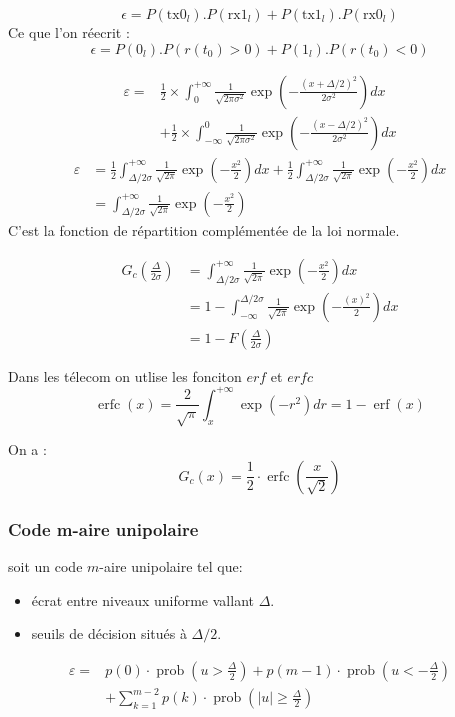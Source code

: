 \documentclass[main.tex]{subfiles}
\begin{document}
\[
\epsilon  = P(\text{tx} 0_l).P(\text{rx} 1_l) + P(\text{tx} 1_l).P(\text{rx} 0_l) 
\]
Ce que l'on réecrit :
\[
\epsilon = P(0_l).P(r(t_0)>0)+P(1_l).P(r(t_0)<0)
\]

\begin{align*}
    \varepsilon=& \frac{1}{2} \times \int_{0}^{+\infty} \frac{1}{\sqrt{2 \pi \sigma^{2}}} \exp \left(-\frac{(x+\Delta / 2)^{2}}{2 \sigma^{2}}\right) d x \\ &+\frac{1}{2} \times \int_{-\infty}^{0} \frac{1}{\sqrt{2 \pi \sigma^{2}}} \exp \left(-\frac{(x-\Delta / 2)^{2}}{2 \sigma^{2}}\right) d x
\end{align*}
\[
  \begin{aligned} \varepsilon &=\frac{1}{2} \int_{\Delta / 2 \sigma}^{+\infty} \frac{1}{\sqrt{2 \pi}} \exp \left(-\frac{x^{2}}{2}\right) d x+\frac{1}{2} \int_{\Delta / 2 \sigma}^{+\infty} \frac{1}{\sqrt{2 \pi}} \exp \left(-\frac{x^{2}}{2}\right) d x \\
    &=\int_{\Delta / 2 \sigma}^{+\infty} \frac{1}{\sqrt{2 \pi}} \exp \left(-\frac{x^{2}}{2}\right)
  \end{aligned}
\]
C'est la fonction de répartition complémentée de la loi normale.

\begin{align*} G_{c}\left(\frac{\Delta}{2 \sigma}\right) &=\int_{\Delta / 2 \sigma}^{+\infty} \frac{1}{\sqrt{2 \pi}} \exp \left(-\frac{x^{2}}{2}\right) d x \\ &=1-\int_{-\infty}^{\Delta / 2 \sigma} \frac{1}{\sqrt{2 \pi}} \exp \left(-\frac{(x)^{2}}{2}\right) d x \\ &=1-F\left(\frac{\Delta}{2 \sigma}\right) \end{align*}

\begin{defin}
  Dans les télecom on utlise les fonciton $erf$ et $erfc$
\[
\operatorname{erfc}(x)=\frac{2}{\sqrt{\pi}} \int_{x}^{+\infty} \exp \left(-r^{2}\right) d r=1-\operatorname{erf}(x)
\]
\end{defin}

\begin{rem}
  On a :
  \[
G_{c}(x)=\frac{1}{2} \cdot \operatorname{erfc}\left(\frac{x}{\sqrt{2}}\right)
\]
\end{rem}
\subsubsection{Code m-aire unipolaire}
soit un code $m$-aire unipolaire tel que:
\begin{itemize}
\item écrat entre niveaux uniforme vallant $\Delta$.
\item seuils de décision situés à $\Delta/2$.
\end{itemize}
\[
  \begin{aligned} \varepsilon=& p(0) \cdot \operatorname{prob}\left(u>\frac{\Delta}{2}\right)+p(m-1) \cdot \operatorname{prob}\left(u<-\frac{\Delta}{2}\right) \\ &+\sum_{k=1}^{m-2} p(k) \cdot \operatorname{prob}\left(|u| \geq \frac{\Delta}{2}\right)
  \end{aligned}
\]
\end{document}

